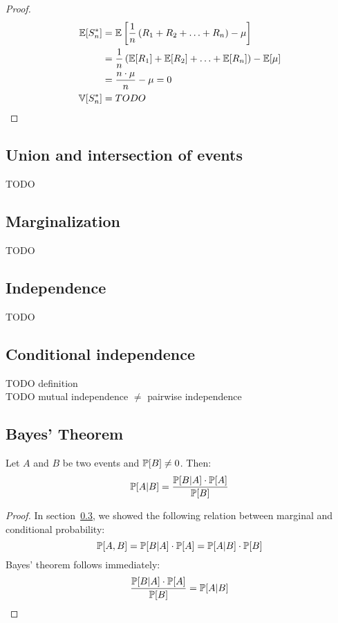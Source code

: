 \begin{proof}
  \begin{align}
      \mathbb E[S^*_n] &= \mathbb E\left[\frac{1}{n}\left(R_1 + R_2 + \ldots + R_n\right) - \mu\right] \nonumber\\
                &= \frac1n \left(\mathbb E[R_1] + \mathbb E[R_2] + \ldots + \mathbb E[R_n]\right) - \mathbb E[\mu] \nonumber\\
                &= \frac{n \cdot \mu}{n} - \mu = 0 \\
    \mathbb V[S^*_n] &= TODO
  \end{align}
\end{proof}

\subsection{Union and intersection of events}
\label{sec:bp-unin}
%
TODO

\subsection{Marginalization}
\label{sec:bp-marginalization}
%
TODO

\subsection{Independence}
\label{sec:bp-indep}
%
TODO

\subsection{Conditional independence}
\label{sec:bp-cond-indep}
%
TODO definition \\
TODO mutual independence $\neq$ pairwise independence

\subsection{Bayes' Theorem}
\label{sec:bp-bayes}
%
\begin{theorem}
  Let $A$ and $B$ be two events and $\mathbb P[B] \neq 0$. Then:
  \[ \mathbb P[A|B] = \frac{\mathbb P[B|A] \cdot \mathbb P[A]}{\mathbb P[B]} \]
\end{theorem}
\begin{proof}
  In section~\ref{sec:bp-indep}, we showed the following relation between marginal and conditional probability:
  \[ \mathbb P[A,B] = \mathbb P[B|A] \cdot \mathbb P[A] = \mathbb P[A|B] \cdot \mathbb P[B] \]
  Bayes' theorem follows immediately:
  \[ \frac{\mathbb P[B|A] \cdot \mathbb P[A]}{\mathbb P[B]} = \mathbb P[A|B] \]
\end{proof}

